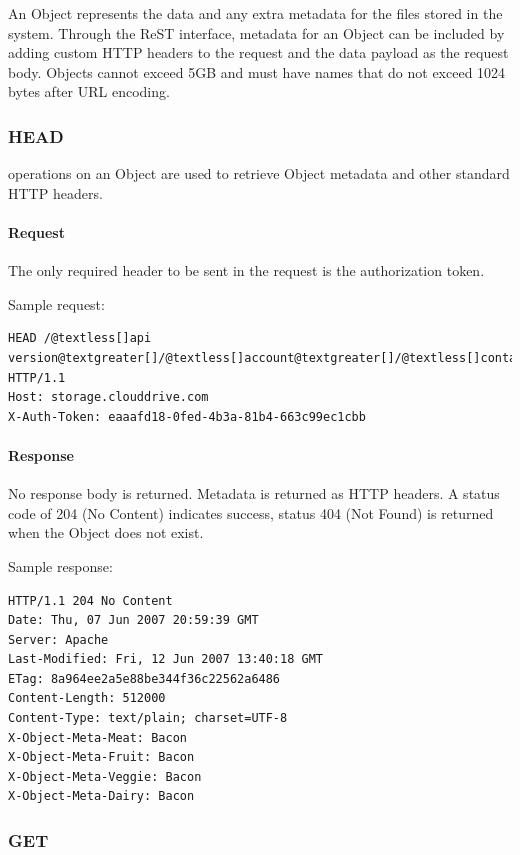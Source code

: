 \documentclass[letterpaper,10pt,english]{manual}
\begin{document}
An Object represents the data and any extra metadata for the files stored
in the system. Through the ReST interface, metadata for an Object can be
included by adding custom HTTP headers to the request and the data payload
as the request body.  Objects cannot exceed 5GB and must have names that
do not exceed 1024 bytes after URL encoding.


\subsubsection{HEAD}

 operations on an Object are used to retrieve Object metadata and
other standard HTTP headers.


\paragraph{Request}

The only required header to be sent in the request is the authorization
token.

Sample request:

\begin{Verbatim}[commandchars=@\[\]]
HEAD /@textless[]api version@textgreater[]/@textless[]account@textgreater[]/@textless[]container@textgreater[]/@textless[]object@textgreater[] HTTP/1.1
Host: storage.clouddrive.com
X-Auth-Token: eaaafd18-0fed-4b3a-81b4-663c99ec1cbb
\end{Verbatim}


\paragraph{Response}

No response body is returned. Metadata is returned as HTTP headers. A
status code of 204 (No Content) indicates success, status 404 (Not Found)
is returned when the Object does not exist.

Sample response:

\begin{Verbatim}[commandchars=@\[\]]
HTTP/1.1 204 No Content
Date: Thu, 07 Jun 2007 20:59:39 GMT
Server: Apache
Last-Modified: Fri, 12 Jun 2007 13:40:18 GMT
ETag: 8a964ee2a5e88be344f36c22562a6486
Content-Length: 512000
Content-Type: text/plain; charset=UTF-8
X-Object-Meta-Meat: Bacon
X-Object-Meta-Fruit: Bacon
X-Object-Meta-Veggie: Bacon
X-Object-Meta-Dairy: Bacon
\end{Verbatim}


\subsubsection{GET}
\end{document}
